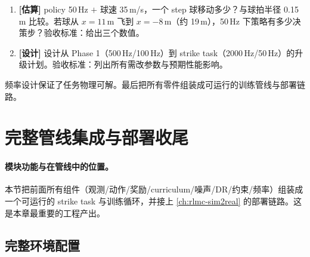 
\begin{practice}[本节动手任务]
\begin{enumerate}
  \item \textbf{[估算]} policy 50\,Hz $+$ 球速 35\,m/s，一个 step 球移动多少？与球拍半径 0.15\,m 比较。若球从 $x=11$\,m 飞到 $x=-8$\,m（约 19\,m），50\,Hz 下策略有多少决策步？验收标准：给出三个数值。
  \item \textbf{[设计]} 设计从 Phase 1（500\,Hz/100\,Hz）到 strike task（2000\,Hz/50\,Hz）的升级计划。验收标准：列出所有需改参数与预期性能影响。
\end{enumerate}
\end{practice}

\noindent{}频率设计保证了任务物理可解。最后把所有零件组装成可运行的训练管线与部署链路。

\section{完整管线集成与部署收尾}
\label{sec:rlmc-strike-integration}

\paragraph{模块功能与在管线中的位置。}本节把前面所有组件（观测/动作/奖励/curriculum/噪声/DR/约束/频率）组装成一个可运行的 strike task 与训练循环，并接上 \cref{ch:rlmc-sim2real} 的部署链路。这是本章最重要的工程产出。

\subsection{完整环境配置}

